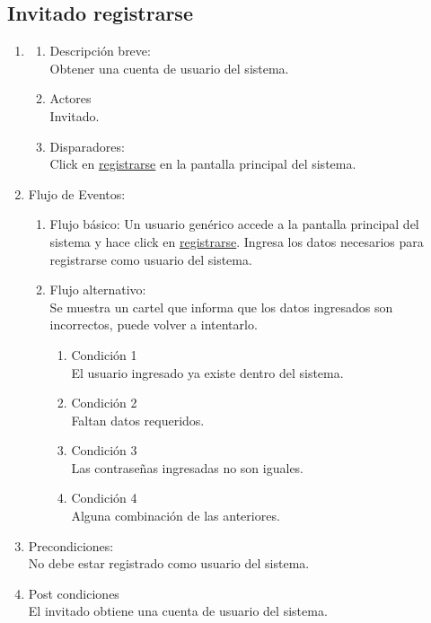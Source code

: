 \documentclass[a4paper,11pt]{article}
\begin{document}
\subsection{Invitado registrarse}
\begin{enumerate}

    \item
        \begin{enumerate}
            \item Descripción breve: \\
                Obtener una cuenta de usuario del sistema.
            \item Actores \\
                Invitado.
            \item Disparadores: \\
                Click en \underline{registrarse} en la pantalla principal del sistema.

        \end{enumerate}

    \item Flujo de Eventos:

        \begin{enumerate}
            \item Flujo básico:
                Un usuario genérico accede a la pantalla principal del sistema y
                hace click en \underline{registrarse}. Ingresa los datos necesarios
                para registrarse como usuario del sistema.

            \item Flujo alternativo:\\
                Se muestra un cartel que informa que los datos ingresados son
                incorrectos, puede volver a intentarlo.

                \begin{enumerate}
                    \item Condición 1 \\
                            El usuario ingresado ya existe dentro del sistema.
                    \item Condición 2 \\
                            Faltan datos requeridos.
                    \item Condición 3 \\
                            Las contrase\~nas ingresadas no son iguales.
                    \item Condición 4 \\
                            Alguna combinación de las anteriores.
                \end{enumerate}
	\end{enumerate}

    \item Precondiciones: \\
        No debe estar registrado como usuario del sistema.

    \item Post condiciones \\
        El invitado obtiene una cuenta de usuario del sistema.

\end{enumerate}
\end{document}
